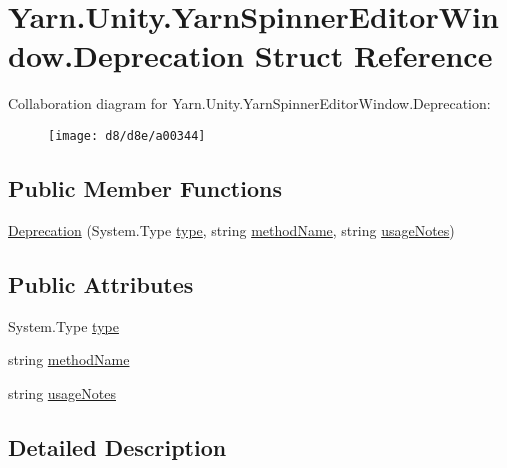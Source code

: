 \hypertarget{a00034}{\section{Yarn.\-Unity.\-Yarn\-Spinner\-Editor\-Window.\-Deprecation Struct Reference}
\label{a00034}
}


Collaboration diagram for Yarn.\-Unity.\-Yarn\-Spinner\-Editor\-Window.\-Deprecation\-:
\nopagebreak
\begin{figure}[H]
\begin{center}
\leavevmode
\texttt{[image: d8/d8e/a00344]}
\end{center}
\end{figure}
\subsection*{Public Member Functions}
\begin{DoxyCompactItemize}
\item 
\hyperlink{a00034_ae80171841e97a48611c51a9a574a2fc0}{Deprecation} (System.\-Type \hyperlink{a00034_a750904df254223bf3131c39017f90a0b}{type}, string \hyperlink{a00034_a61605b2d0a17dfdf9c62952270d44fbd}{method\-Name}, string \hyperlink{a00034_ac23509be7ae6b43a3e2154dd430954a7}{usage\-Notes})
\end{DoxyCompactItemize}
\subsection*{Public Attributes}
\begin{DoxyCompactItemize}
\item 
System.\-Type \hyperlink{a00034_a750904df254223bf3131c39017f90a0b}{type}
\item 
string \hyperlink{a00034_a61605b2d0a17dfdf9c62952270d44fbd}{method\-Name}
\item 
string \hyperlink{a00034_ac23509be7ae6b43a3e2154dd430954a7}{usage\-Notes}
\end{DoxyCompactItemize}


\subsection{Detailed Description}


